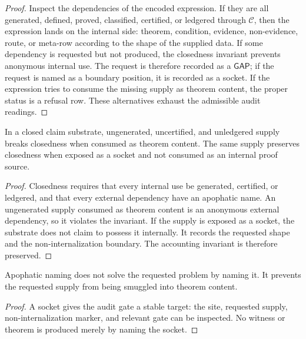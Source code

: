 \begin{proof}
Inspect the dependencies of the encoded expression.  If they are all
generated, defined, proved, classified, certified, or ledgered through
$\mathcal C$, then the expression lands on the internal side: theorem,
condition, evidence, non-evidence, route, or meta-row according to the
shape of the supplied data.  If some dependency is requested but not
produced, the closedness invariant prevents anonymous internal use.  The
request is therefore recorded as a $\mathsf{GAP}$; if the request is named
as a boundary position, it is recorded as a socket.  If the expression tries
to consume the missing supply as theorem content, the proper status is a
refusal row.  These alternatives exhaust the admissible audit readings.
\end{proof}

\begin{theorem}
\label{thm:legitimate-claim-no-hidden-supply}
In a closed claim substrate, ungenerated, uncertified, and unledgered supply
breaks closedness when consumed as theorem content.  The same supply
preserves closedness when exposed as a socket and not consumed as an
internal proof source.
\end{theorem}

\begin{proof}
Closedness requires that every internal use be generated, certified, or
ledgered, and that every external dependency have an apophatic name.  An
ungenerated supply consumed as theorem content is an anonymous external
dependency, so it violates the invariant.  If the supply is exposed as a
socket, the substrate does not claim to possess it internally.  It records
the requested shape and the non-internalization boundary.  The accounting
invariant is therefore preserved.
\end{proof}

\begin{corollary}
\label{cor:legitimate-claim-naming-prevents-smuggling}
Apophatic naming does not solve the requested problem by naming it.  It
prevents the requested supply from being smuggled into theorem content.
\end{corollary}

\begin{proof}
A socket gives the audit gate a stable target: the site, requested supply,
non-internalization marker, and relevant gate can be inspected.  No witness
or theorem is produced merely by naming the socket.
\end{proof}


